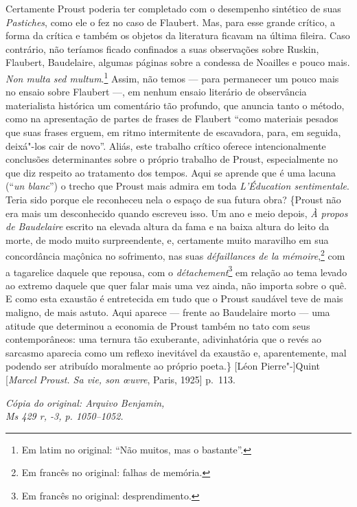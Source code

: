 Certamente Proust poderia ter completado com o desempenho sintético de
suas \emph{Pastiches}, como ele o fez no caso de Flaubert. Mas, para esse
grande crítico, a forma da crítica e também os objetos da literatura
ficavam na última fileira. Caso contrário, não teríamos ficado
confinados a suas observações sobre Ruskin, Flaubert, Baudelaire,
algumas páginas sobre a condessa de Noailles e pouco mais. \emph{Non
multa sed multum}.\footnote{Em latim no original: ``Não muitos,
  mas o bastante''. \versal{[N.~T.]}} Assim, não temos --- para permanecer um pouco mais
no ensaio sobre Flaubert ---, em nenhum ensaio literário de observância
materialista histórica um comentário tão profundo, que anuncia tanto o
método, como na apresentação de partes de frases de Flaubert ``como
materiais pesados que suas frases erguem, em ritmo intermitente de
escavadora, para, em seguida, deixá"-los cair de novo''. Aliás, este
trabalho crítico oferece intencionalmente conclusões determinantes sobre
o próprio trabalho de Proust, especialmente no que diz respeito ao
tratamento dos tempos. Aqui se aprende que é uma lacuna (``\emph{un
blanc}'') o trecho que Proust mais admira em toda \emph{L'Éducation
sentimentale}. Teria sido porque ele reconheceu nela o espaço de sua
futura obra? \{Proust não era mais um desconhecido quando escreveu isso.
Um ano e meio depois, \emph{À propos de Baudelaire} escrito na
elevada altura da fama e na baixa altura do leito da morte, de modo muito
surpreendente, e, certamente muito maravilho em sua concordância
maçônica no sofrimento, nas suas \emph{défaillances de la
mémoire},\footnote{Em francês no original: falhas de memória. \versal{[N.~T.]}}
com a tagarelice daquele que repousa, com o \emph{détachement}\footnote{Em francês no original: desprendimento. \versal{[N.~T.]}} em
relação ao tema levado ao extremo daquele que quer falar mais uma
vez ainda, não importa sobre o quê. E como esta exaustão é entretecida em
tudo que o Proust saudável teve de mais maligno, de mais astuto. Aqui
aparece --- frente ao Baudelaire morto --- uma atitude que determinou a
economia de Proust também no tato com seus contemporâneos: uma ternura
tão exuberante, adivinhatória que o revés ao sarcasmo aparecia como
um reflexo inevitável da exaustão e, aparentemente, mal podendo ser
atribuído moralmente ao próprio poeta.\} {[}Léon Pierre"-{]}Quint
{[}\emph{Marcel Proust. Sa vie, son \oe uvre}, Paris, 1925{]} p.~113.

\begin{flushright}
\emph{\footnotesize{Cópia do original: Arquivo Benjamin,\\ Ms 429 r, -3, p. 1050--1052.}}
\end{flushright}

